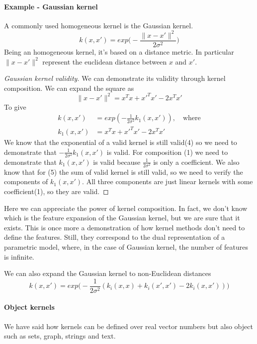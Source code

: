 \documentclass[main.tex]{subfiles}
\begin{document}
\paragraph{Example - Gaussian kernel} A commonly used homogeneous kernel is the Gaussian kernel.
\begin{equation}
    k(x,x') = exp \bigg(-\frac{\|x-x'\|^2}{2\sigma^2} \bigg)
\end{equation}
Being an homogeneous kernel, it's based on a distance metric. In particular $\|x-x'\|^2$ represent the euclidean distance between $x$ and $x'$.
\begin{proof}[Gaussian kernel validity]
    We can demonstrate its validity through kernel composition.
    We can expand the square as
    \begin{equation*}
        \|x-x'\|^2 = x^Tx + x'^Tx' -2x^Tx'
    \end{equation*}
    To give
    \begin{align*}
        k(x,x')   & = exp(-\frac{1}{2\sigma^2} k_1(x,x')), \quad \text{where} \\
        k_1(x,x') & = x^Tx + x'^Tx' - 2x^Tx'
    \end{align*}
    We know that the exponential of a valid kernel is still valid(4) so we need to demonstrate that $-\frac{1}{2\sigma^2}k_1(x,x')$ is valid.
    For composition (1) we need to demonstrate that $k_1(x,x')$ is valid because $\frac{1}{2\sigma^2}$ is only a coefficient. We also know that for (5) the sum of valid kernel is still valid, so we need to verify the components of $k_1(x,x')$. All three components are just linear kernels with some coefficient(1), so they are valid.
\end{proof}
Here we can appreciate the power of kernel composition. In fact, we don't know which is the feature expansion of the Gaussian kernel, but we are sure that it exists. This is once more a demonstration of how kernel methods don't need to define the features. Still, they correspond to the dual representation of a parametric model, where, in the case of Gaussian kernel, the number of features is infinite.

We can also expand the Gaussian kernel to non-Euclidean distances
\begin{equation}
    k(x,x') = exp\bigg( -\frac{1}{2\sigma^2}(k_i(x,x) + k_i(x',x') - 2k_i(x,x'))  \bigg)
\end{equation}

\paragraph{Object kernels}
We have said how kernels can be defined over real vector numbers but also object such as sets, graph, strings and text.
\end{document}
